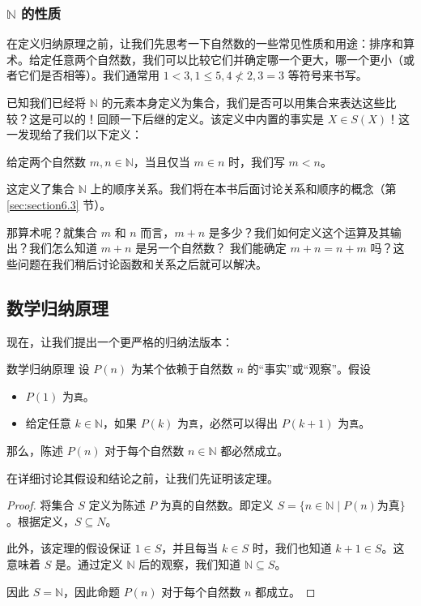 \subsubsection*{$\mathbb{N}$ 的性质}

在定义归纳原理之前，让我们先思考一下自然数的一些常见性质和用途：排序和算术。给定任意两个自然数，我们可以比较它们并确定哪一个更大，哪一个更小（或者它们是否相等）。我们通常用 $1 < 3, 1 \le 5, 4 \nless 2, 3 = 3$ 等符号来书写。

已知我们已经将 $\mathbb{N}$ 的元素本身定义为集合，我们是否可以用集合来表达这些比较？这是可以的！回顾一下后继的定义。该定义中内置的事实是 $X \in S(X)$！这一发现给了我们以下定义：

\begin{definition}
    给定两个自然数 $m, n \in \mathbb{N}$，当且仅当 $m \in n$ 时，我们写 $m < n$。
\end{definition}

这定义了集合 $\mathbb{N}$ 上的顺序关系。我们将在本书后面讨论关系和顺序的概念（第 \ref{sec:section6.3} 节）。

那算术呢？就集合 $m$ 和 $n$ 而言，$m + n$ 是多少？我们如何定义这个运算及其输出？我们怎么知道 $m + n$ 是另一个自然数？ 我们能确定 $m + n = n + m$ 吗？这些问题在我们稍后讨论函数和关系之后就可以解决。

\subsection{数学归纳原理}\label{sec:section3.8.2}

现在，让我们提出一个更严格的归纳法版本：

\begin{theorem}{数学归纳原理}\label{theorem3.8}
    设 $P(n)$ 为某个依赖于自然数 $n$ 的``事实''或``观察''。假设
    \begin{itemize}
        \item $P(1)$ 为\verb|真|。
        \item 给定任意 $k \in \mathbb{N}$，如果 $P(k)$ 为\verb|真|，必然可以得出 $P(k+1)$ 为\verb|真|。
    \end{itemize}
    那么，陈述 $P(n)$ 对于每个自然数 $n \in \mathbb{N}$ 都必然成立。
\end{theorem}

在详细讨论其假设和结论之前，让我们先证明该定理。

\begin{proof}
    将集合 $S$ 定义为陈述 $P$ 为真的自然数。即定义 $S = \{n \in \mathbb{N} \mid P(n) \text{为真}\}$。根据定义，$S \subseteq N$。

    此外，该定理的假设保证 $1 \in S$，并且每当 $k \in S$ 时，我们也知道 $k + 1 \in S$。这意味着 $S$ 是。通过定义 $\mathbb{N}$ 后的观察，我们知道 $\mathbb{N} \subseteq S$。

    因此 $S = \mathbb{N}$，因此命题 $P(n)$ 对于每个自然数 $n$ 都成立。
\end{proof}

